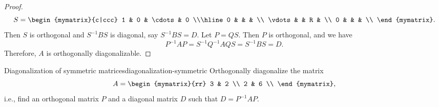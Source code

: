 \begin{proof}
  \begin{equation*}
    S = \begin{mymatrix}{c|ccc}
      1 & 0 & \cdots & 0 \\\hline
      0 &  & & \\
      \vdots & & R & \\
      0 &  & & \\
    \end{mymatrix}.
  \end{equation*}
  Then $S$ is orthogonal and $S^{-1}BS$ is diagonal, say
  $S^{-1}BS = D$. Let $P=QS$. Then $P$ is orthogonal, and we have
  \begin{equation*}
    P^{-1}AP = S^{-1}Q^{-1}AQS = S^{-1}BS = D.
  \end{equation*}
  Therefore, $A$ is orthogonally diagonalizable.
\end{proof}

\begin{example}{Diagonalization of symmetric matrices}{diagonalization-symmetric}
  Orthogonally diagonalize the matrix
  \begin{equation*}
    A = \begin{mymatrix}{rr}
      3 & 2 \\
      2 & 6 \\
    \end{mymatrix},
  \end{equation*}
  i.e., find an orthogonal matrix $P$ and a diagonal matrix $D$ such
  that $D = P^{-1}AP$.
\end{example}

